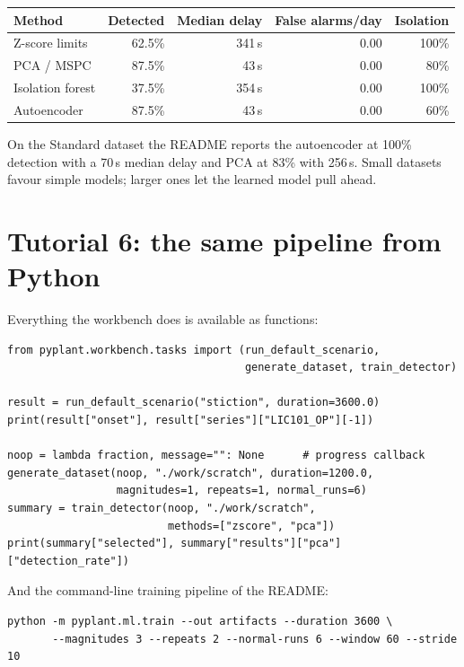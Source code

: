 \begin{center}
\begin{tabular}{@{}lrrrr@{}}
\toprule
Method & Detected & Median delay & False alarms/day & Isolation \\
\midrule
Z-score limits & 62.5\% & 341\,s & 0.00 & 100\% \\
PCA / MSPC & 87.5\% & 43\,s & 0.00 & 80\% \\
Isolation forest & 37.5\% & 354\,s & 0.00 & 100\% \\
Autoencoder & 87.5\% & 43\,s & 0.00 & 60\% \\
\bottomrule
\end{tabular}
\end{center}

On the Standard dataset the README reports the autoencoder at 100\%
detection with a 70\,s median delay and PCA at 83\% with 256\,s. Small
datasets favour simple models; larger ones let the learned model pull ahead.

\section{Tutorial 6: the same pipeline from Python}

Everything the workbench does is available as functions:

\begin{lstlisting}
from pyplant.workbench.tasks import (run_default_scenario,
                                     generate_dataset, train_detector)

result = run_default_scenario("stiction", duration=3600.0)
print(result["onset"], result["series"]["LIC101_OP"][-1])

noop = lambda fraction, message="": None      # progress callback
generate_dataset(noop, "./work/scratch", duration=1200.0,
                 magnitudes=1, repeats=1, normal_runs=6)
summary = train_detector(noop, "./work/scratch",
                         methods=["zscore", "pca"])
print(summary["selected"], summary["results"]["pca"]["detection_rate"])
\end{lstlisting}

And the command-line training pipeline of the README:

\begin{lstlisting}[style=sh]
python -m pyplant.ml.train --out artifacts --duration 3600 \
       --magnitudes 3 --repeats 2 --normal-runs 6 --window 60 --stride 10
\end{lstlisting}
